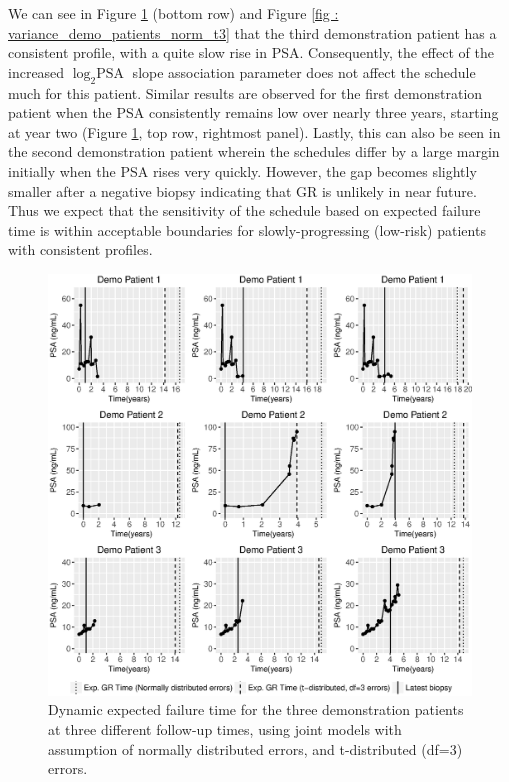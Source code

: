 \begin{enumerate}
    We can see in Figure \ref{fig : demo_expfail_norm_t3} (bottom row) and Figure \ref{fig : variance_demo_patients_norm_t3} that the third demonstration patient has a consistent profile, with a quite slow rise in PSA. Consequently, the effect of the increased $\log_2 \mbox{PSA}$ slope association parameter does not affect the schedule much for this patient. Similar results are observed for the first demonstration patient when the PSA consistently remains low over nearly three years, starting at year two (Figure \ref{fig : demo_expfail_norm_t3}, top row, rightmost panel). Lastly, this can also be seen in the second demonstration patient wherein the schedules differ by a large margin initially when the PSA rises very quickly. However, the gap becomes slightly smaller after a negative biopsy indicating that GR is unlikely in near future. Thus we expect that the sensitivity of the schedule based on expected failure time is within acceptable boundaries for slowly-progressing (low-risk) patients with consistent profiles.

    \begin{figure}[!htb]
    \centerline{\includegraphics[width=\columnwidth]{images/model_fit/demo_expfail_norm_t3.eps}}
    \caption{Dynamic expected failure time for the three demonstration patients at three different follow-up times, using joint models with assumption of normally distributed errors, and t-distributed (df=3) errors.}
    \label{fig : demo_expfail_norm_t3}
    \end{figure}


\end{enumerate}
